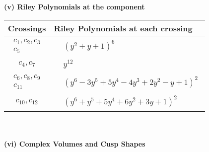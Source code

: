 \documentclass[1p]{elsarticle_modified}
\theoremstyle{definition}
\begin{document}
\newpage\renewcommand{\arraystretch}{1}
\flushleft \textbf{(v) Riley Polynomials at the component}\newline \\
\begin{tabular}{m{50pt}|m{274pt}}
Crossings & \hspace{64pt}Riley Polynomials at each crossing \\
\hline $$\begin{aligned}c_{1},c_{2},c_{3}\\c_{5}\end{aligned}$$&$\begin{aligned}
&(y^2+y+1)^6
\end{aligned}$\\
\hline $$\begin{aligned}c_{4},c_{7}\end{aligned}$$&$\begin{aligned}
&y^{12}
\end{aligned}$\\
\hline $$\begin{aligned}c_{6},c_{8},c_{9}\\c_{11}\end{aligned}$$&$\begin{aligned}
&(y^6-3 y^5+5 y^4-4 y^3+2 y^2- y+1)^2
\end{aligned}$\\
\hline $$\begin{aligned}c_{10},c_{12}\end{aligned}$$&$\begin{aligned}
&(y^6+y^5+5 y^4+6 y^2+3 y+1)^2
\end{aligned}$\\
\hline
\end{tabular}\\~\\
\newpage\flushleft \textbf{(vi) Complex Volumes and Cusp Shapes}
\end{document}
